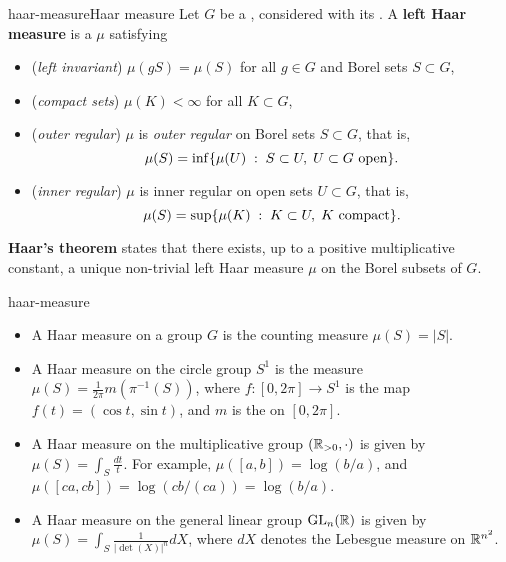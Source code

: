 \begin{topic}{haar-measure}{Haar measure}
    Let $G$ be a   , considered with its . A \textbf{left Haar measure} is a  $\mu$ satisfying
    \begin{itemize}
        \item (\textit{left invariant}) $\mu(gS) = \mu(S)$ for all $g \in G$ and Borel sets $S \subset G$,
        \item (\textit{compact sets}) $\mu(K) < \infty$ for all  $K \subset G$,
        \item (\textit{outer regular}) $\mu$ is \textit{outer regular} on Borel sets $S \subset G$, that is,
        \[ \mu(S) = \inf \{ \mu(U) \;:\; S \subset U, \; U \subset G \textup{ open} \} . \]
        \item (\textit{inner regular}) $\mu$ is inner regular on open sets $U \subset G$, that is,
        \[ \mu(S) = \sup \{ \mu(K) \;:\; K \subset U, \; K \textup{ compact} \} . \]
    \end{itemize}
    \textbf{Haar's theorem} states that there exists, up to a positive multiplicative constant, a unique non-trivial left Haar measure $\mu$ on the Borel subsets of $G$.
\end{topic}

\begin{example}{haar-measure}
    \begin{itemize}
        \item A Haar measure on a  group $G$ is the counting measure $\mu(S) = |S|$.
        \item A Haar measure on the circle group $S^1$ is the measure $\mu(S) = \frac{1}{2 \pi} m(\pi^{-1}(S))$, where $f : [0, 2 \pi] \to S^1$ is the map $f(t) = (\cos t, \sin t)$, and $m$ is the  on $[0, 2 \pi]$.
        \item A Haar measure on the multiplicative group $(\mathbb{R}_{> 0}, \cdot)$ is given by $\mu(S) = \int_S \frac{dt}{t}$. For example, $\mu([a, b]) = \log(b/a)$, and $\mu([ca, cb]) = \log(cb/(ca)) = \log(b/a)$.
        \item A Haar measure on the general linear group $\textup{GL}_n(\mathbb{R})$ is given by $\mu(S) = \int_S \frac{1}{|\det(X)|^n} dX$, where $dX$ denotes the Lebesgue measure on $\mathbb{R}^{n^2}$.
    \end{itemize}
\end{example}

